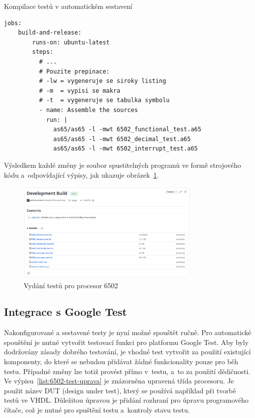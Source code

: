 \begin{listing}
	\caption{Kompilace testů v automatickém sestavení}
	\label{list:6502-test-sestaveni}
	\begin{verbatim}
jobs:
    build-and-release:
        runs-on: ubuntu-latest
        steps:
          # ...
          # Pouzite prepinace:
          # -lw = vygeneruje se siroky listing
          # -m  = vypisi se makra
          # -t  = vygeneruje se tabulka symbolu
          - name: Assemble the sources
            run: |
              as65/as65 -l -mwt 6502_functional_test.a65
              as65/as65 -l -mwt 6502_decimal_test.a65
              as65/as65 -l -mwt 6502_interrupt_test.a65
	\end{verbatim}
\end{listing}

Výsledkem každé změny je soubor spustitelných programů ve formě strojového kódu a~odpovídající výpisy, jak ukazuje obrázek~\ref{fig:vydani-testu-6502}.

\begin{figure}[ht!]
	\centering
	\caption{Vydání testů pro procesor 6502}
	\label{fig:vydani-testu-6502}
    \includegraphics[width=0.8\textwidth]{images/vydani-testu-6502.png}
\end{figure}

\subsection{Integrace s Google Test}
Nakonfigurované a sestavené testy je nyní možné spouštět ručně. Pro automatické spouštění je nutné vytvořit testovací funkci pro platformu Google Test. Aby byly dodržovány zásady dobrého testování, je vhodné test vytvořit za použití existující komponenty, do které se nebudou přidávat žádné funkcionality pouze pro běh testu. Případné změny lze totiž provést přímo v~testu, a~to za použití dědičnosti. Ve výpisu~\ref{list:6502-test-uprava} je znázorněna upravená třída procesoru. Je použit název DUT (design under test), který se používá například při tvorbě testů ve VHDL. Důležitou úpravou je přidání rozhraní pro úpravu programového čítače, což je nutné pro spuštění testu a~kontroly stavu testu.

